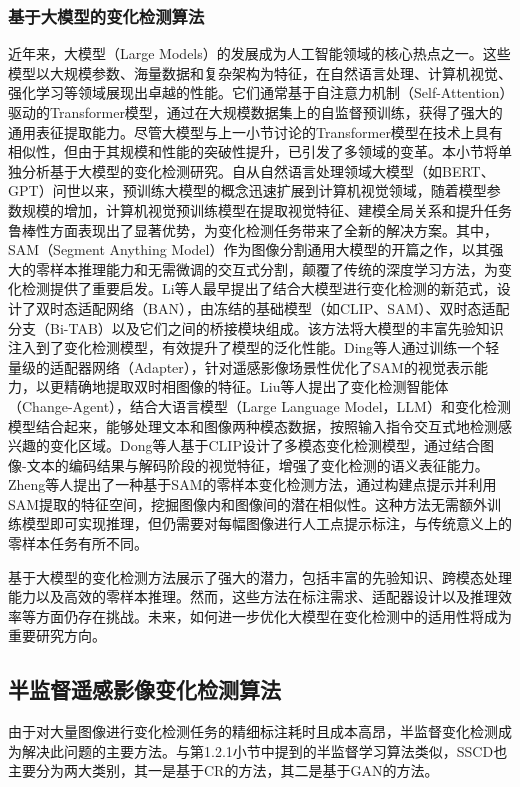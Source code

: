 \documentclass[lang=chs, degree=master, blindreview=false, adobe=false]{yanputhesis}
\begin{document}
\subsubsection{基于大模型的变化检测算法}
近年来，大模型（Large Models）的发展成为人工智能领域的核心热点之一。这些模型以大规模参数、海量数据和复杂架构为特征，在自然语言处理、计算机视觉、强化学习等领域展现出卓越的性能。它们通常基于自注意力机制（Self-Attention）驱动的Transformer模型，通过在大规模数据集上的自监督预训练，获得了强大的通用表征提取能力。尽管大模型与上一小节讨论的Transformer模型在技术上具有相似性，但由于其规模和性能的突破性提升，已引发了多领域的变革。本小节将单独分析基于大模型的变化检测研究。自从自然语言处理领域大模型（如BERT、GPT）问世以来，预训练大模型的概念迅速扩展到计算机视觉领域，随着模型参数规模的增加，计算机视觉预训练模型在提取视觉特征、建模全局关系和提升任务鲁棒性方面表现出了显著优势，为变化检测任务带来了全新的解决方案。其中，SAM\cite{kirillov2023SAM}（Segment Anything Model）作为图像分割通用大模型的开篇之作，以其强大的零样本推理能力和无需微调的交互式分割，颠覆了传统的深度学习方法，为变化检测提供了重要启发。Li等人\cite{li2024LM}最早提出了结合大模型进行变化检测的新范式，设计了双时态适配网络（BAN），由冻结的基础模型（如CLIP\cite{radford2021clip}、SAM）、双时态适配分支（Bi-TAB）以及它们之间的桥接模块组成。该方法将大模型的丰富先验知识注入到了变化检测模型，有效提升了模型的泛化性能。Ding等人\cite{ding2024SAMCD}通过训练一个轻量级的适配器网络（Adapter），针对遥感影像场景性优化了SAM的视觉表示能力，以更精确地提取双时相图像的特征。Liu等人\cite{liu2024changeagent}提出了变化检测智能体（Change-Agent），结合大语言模型（Large Language Model，LLM）和变化检测模型结合起来，能够处理文本和图像两种模态数据，按照输入指令交互式地检测感兴趣的变化区域。Dong等人\cite{dong2024changeclip}基于CLIP设计了多模态变化检测模型，通过结合图像-文本的编码结果与解码阶段的视觉特征，增强了变化检测的语义表征能力。Zheng等人\cite{zheng2024SAC}提出了一种基于SAM的零样本变化检测方法，通过构建点提示并利用SAM提取的特征空间，挖掘图像内和图像间的潜在相似性。这种方法无需额外训练模型即可实现推理，但仍需要对每幅图像进行人工点提示标注，与传统意义上的零样本任务有所不同。

基于大模型的变化检测方法展示了强大的潜力，包括丰富的先验知识、跨模态处理能力以及高效的零样本推理。然而，这些方法在标注需求、适配器设计以及推理效率等方面仍存在挑战。未来，如何进一步优化大模型在变化检测中的适用性将成为重要研究方向。
\subsection{半监督遥感影像变化检测算法}
由于对大量图像进行变化检测任务的精细标注耗时且成本高昂，半监督变化检测成为解决此问题的主要方法。与第1.2.1小节中提到的半监督学习算法类似，SSCD也主要分为两大类别，其一是基于CR的方法，其二是基于GAN的方法。
\end{document}
